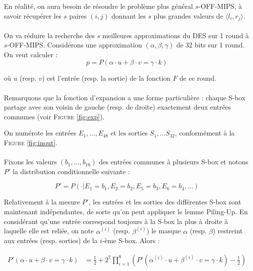 \documentclass{scrartcl}
\begin{document}
En réalité, on aura besoin de résoudre le problème plus général $s$-OFF-MIPS, à savoir récupérer les $s$ paires $(i,j)$ donnant
les $s$ plus grandes valeurs de $\langle l_i,r_j\rangle$.

\paragraph*{}
On va réduire la recherche des $s$ meilleures approximations du DES sur 1 round à $s$-OFF-MIPS.
Considérons une approximation $(\alpha, \beta, \gamma)$ de 32 bits sur 1 round. On veut calculer :
$$p=P(\alpha\cdot u + \beta\cdot v=\gamma\cdot k)$$

où $u$ (resp. $v$) est l'entrée (resp. la sortie) de la fonction $F$ de ce round.

\paragraph*{}
Remarquons que la fonction d'expansion a une forme particulière : chaque S-box partage avec son voisin de gauche
(resp. de droite) exactement deux entrées communes (voir \textsc{Figure} \ref{fig:exp}).

On numérote les entrées $E_1, \ldots, E_{48}$ et les sorties $S_1, \ldots S_{32}$, conformément à la \textsc{Figure} \ref{fig:inout}.



\paragraph*{}
Fixons les valeurs $(b_1, \ldots, b_{16})$ des entrées communes à plusieurs S-box et notons $P'$ la distribution conditionnelle
suivante :

$$P' = P(\cdot | E_1=b_1, E_2=b_2, E_5=b_3, E_6=b_4,\ldots)$$

Relativement à la mesure $P'$, les entrées et les sorties des différentes S-box sont maintenant indépendantes, de sorte qu'on peut appliquer
le lemme Piling-Up. En considérant qu'une entrée correspond toujours à la S-box la plus à droite à laquelle elle est reliée, 
on note $\alpha^{(i)}$ (resp. $\beta^{(i)}$) le masque $\alpha$ (resp. $\beta$) restreint aux entrées (resp. sorties)
de la $i$-ème S-box. Alors :

\begin{align*}
	P'(\alpha\cdot u+\beta\cdot v=\gamma\cdot k)&=\frac{1}{2}+2^{7}\prod_{i=1}^8 \left(P'(\alpha^{(i)}\cdot u+\beta^{(i)}\cdot v =\gamma\cdot k)-\frac{1}{2}\right)\\
\end{align*}
\end{document}
